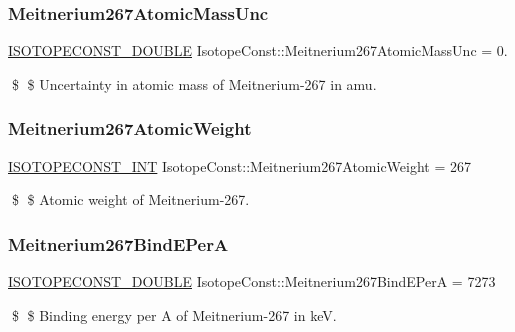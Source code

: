 \subsubsection{\texorpdfstring{Meitnerium267\+Atomic\+Mass\+Unc}{Meitnerium267AtomicMassUnc}}
{\footnotesize\ttfamily \mbox{\hyperlink{group___isotope_const-_macros_ga8f45a7272ce02c0b4c65c44636ed719a}{I\+S\+O\+T\+O\+P\+E\+C\+O\+N\+S\+T\+\_\+\+D\+O\+U\+B\+LE}} Isotope\+Const\+::\+Meitnerium267\+Atomic\+Mass\+Unc = 0.}

\$ \$ Uncertainty in atomic mass of Meitnerium-\/267 in amu. \mbox{\label{group___isotope_const-_meitnerium-_mt267_gaf53be318d650e0a7d1d95b93393af772}} 
\subsubsection{\texorpdfstring{Meitnerium267\+Atomic\+Weight}{Meitnerium267AtomicWeight}}
{\footnotesize\ttfamily \mbox{\hyperlink{group___isotope_const-_macros_ga5f18360b3e99483a35c32d789e62621c}{I\+S\+O\+T\+O\+P\+E\+C\+O\+N\+S\+T\+\_\+\+I\+NT}} Isotope\+Const\+::\+Meitnerium267\+Atomic\+Weight = 267}

\$ \$ Atomic weight of Meitnerium-\/267. \mbox{\label{group___isotope_const-_meitnerium-_mt267_ga00ee1e8cbac95e6644166019a5c87f08}} 
\subsubsection{\texorpdfstring{Meitnerium267\+Bind\+E\+PerA}{Meitnerium267BindEPerA}}
{\footnotesize\ttfamily \mbox{\hyperlink{group___isotope_const-_macros_ga8f45a7272ce02c0b4c65c44636ed719a}{I\+S\+O\+T\+O\+P\+E\+C\+O\+N\+S\+T\+\_\+\+D\+O\+U\+B\+LE}} Isotope\+Const\+::\+Meitnerium267\+Bind\+E\+PerA = 7273}

\$ \$ Binding energy per A of Meitnerium-\/267 in keV. \mbox{\label{group___isotope_const-_meitnerium-_mt267_gaed5337a263e983bcf62c950ef7bb8015}} 

